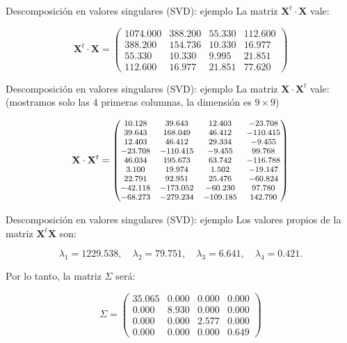 \documentclass[
  ignorenonframetext,
]{beamer}
\begin{document}
\begin{frame}{Descomposición en valores singulares (SVD): ejemplo}
\protect\hypertarget{descomposiciuxf3n-en-valores-singulares-svd-ejemplo-1}{}
La matriz \(\mathbf{X}^t\cdot \mathbf{X}\) vale:

\[
\mathbf{X}^t\cdot \mathbf{X}=\begin{pmatrix}
  1074.000 & 388.200 & 55.330 & 112.600 \\ 
  388.200 & 154.736 & 10.330 & 16.977 \\ 
  55.330 & 10.330 & 9.995 & 21.851 \\ 
  112.600 & 16.977 & 21.851 & 77.620 
\end{pmatrix}
\]
\end{frame}

\begin{frame}{Descomposición en valores singulares (SVD): ejemplo}
\protect\hypertarget{descomposiciuxf3n-en-valores-singulares-svd-ejemplo-2}{}
La matriz \(\mathbf{X}\cdot \mathbf{X}^t\) vale: (mostramos solo las 4
primeras columnas, la dimensión es \(9\times 9\))

\[
{\footnotesize
\mathbf{X}\cdot \mathbf{X}^t=\begin{pmatrix}
10.128 & 39.643 & 12.403 & -23.708 \\ 
  39.643 & 168.049 & 46.412 & -110.415 \\ 
  12.403 & 46.412 & 29.334 & -9.455 \\ 
  -23.708 & -110.415 & -9.455 & 99.768 \\ 
  46.034 & 195.673 & 63.742 & -116.788 \\ 
  3.100 & 19.974 & 1.502 & -19.147 \\ 
  22.791 & 92.951 & 25.476 & -60.824 \\ 
  -42.118 & -173.052 & -60.230 & 97.780 \\ 
  -68.273 & -279.234 & -109.185 & 142.790
\end{pmatrix}
}
\]
\end{frame}

\begin{frame}{Descomposición en valores singulares (SVD): ejemplo}
\protect\hypertarget{descomposiciuxf3n-en-valores-singulares-svd-ejemplo-3}{}
Los valores propios de la matriz \(\mathbf{X}^t\mathbf{X}\) son:

\[
\lambda_1=1229.538,\quad \lambda_2=79.751,\quad \lambda_3=6.641, \quad  
\lambda_4= 0.421. 
\]

Por lo tanto, la matriz \(\Sigma\) será:

\[
\Sigma =\begin{pmatrix} 
35.065 & 0.000 & 0.000 & 0.000 \\ 
  0.000 & 8.930 & 0.000 & 0.000 \\ 
  0.000 & 0.000 & 2.577 & 0.000 \\ 
  0.000 & 0.000 & 0.000 & 0.649 
  \end{pmatrix}
\]
\end{frame}
\end{document}
